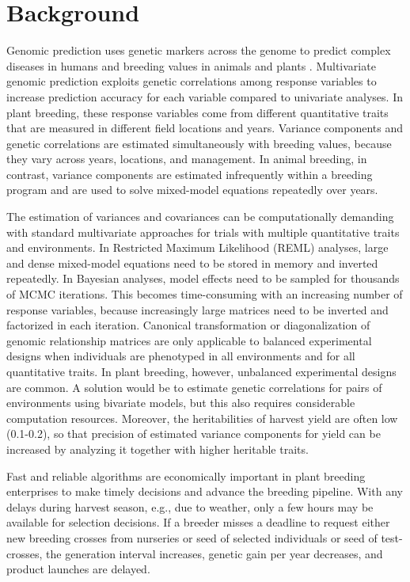 \documentclass{bmcart}
\begin{document}
\section{Background}

Genomic prediction \cite{Meuwissen2001} uses genetic markers across the genome to predict complex diseases in humans and breeding values in animals and plants \cite{WGR2013,Hickey2017}. Multivariate genomic prediction \cite{Calus2011} 
exploits genetic correlations 
among response variables to increase prediction accuracy for each variable \cite{yi2012} compared to univariate analyses. In plant breeding, these response variables come from different quantitative traits that are measured in different field locations and years. Variance components and genetic correlations are estimated simultaneously with breeding values, because they vary across years, 
locations, and management. In animal breeding, in contrast, variance components are  estimated infrequently within a breeding program and are used to solve mixed-model equations repeatedly over years.

The estimation of variances and covariances can be computationally demanding with standard multivariate approaches for trials with multiple quantitative traits and environments. In Restricted Maximum Likelihood (REML) analyses, large and dense mixed-model equations need to be stored in memory and inverted repeatedly. In Bayesian analyses, model effects need to be sampled for thousands of MCMC iterations. This becomes time-consuming with an increasing number of response variables, because increasingly large matrices need to be inverted and factorized in each iteration. Canonical transformation \cite{Meyer1985} or diagonalization of genomic relationship matrices \cite{TS1990} are only applicable to balanced experimental designs when individuals are phenotyped in all environments and for all quantitative traits. In plant breeding, however, unbalanced experimental designs are common. A solution would be to estimate genetic correlations for pairs of environments using bivariate models, but this also requires considerable  computation resources. Moreover, the heritabilities of harvest yield are often low (0.1-0.2), so that precision of estimated variance components for yield can be increased by analyzing it together with higher heritable traits.

Fast and reliable algorithms are economically important in plant breeding enterprises to make timely decisions and advance the breeding pipeline. With any delays during harvest season, e.g., due to weather, only a few hours may be available for selection decisions. If a breeder misses a deadline to request either new breeding crosses from nurseries or seed of selected individuals or seed of test-crosses, the generation interval increases, genetic gain per year decreases, and product launches are delayed. 
\end{document}
